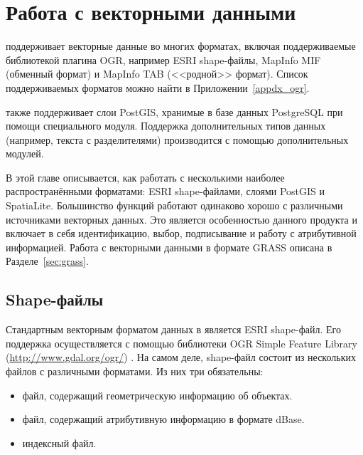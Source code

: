 
\chapter{Работа с векторными данными}\label{label_workingvector}


\qg поддерживает векторные данные во многих форматах, включая
поддерживаемые библиотекой плагина OGR, например ESRI shape-файлы,
MapInfo MIF (обменный формат)
и MapInfo TAB (<<родной>> формат).
Список поддерживаемых форматов можно найти в Приложении~\ref{appdx_ogr}.

\qg также поддерживает слои PostGIS,
хранимые в базе данных PostgreSQL при помощи специального модуля. Поддержка
дополнительных типов данных (например, текста с разделителями) производится
с помощью дополнительных модулей.

В этой главе описывается, как работать с несколькими наиболее
распространёнными форматами: ESRI shape-файлами, слоями PostGIS и SpatiaLite.
Большинство функций \qg работают одинаково хорошо с различными источниками
векторных данных. Это является особенностью данного продукта и включает в
себя идентификацию, выбор, подписывание и работу с атрибутивной информацией.
Работа с векторными данными в формате GRASS описана в Разделе~\ref{sec:grass}.

\section{Shape-файлы}

Стандартным векторным форматом данных в \qg является ESRI shape-файл. Его
поддержка осуществляется с помощью библиотеки OGR Simple Feature Library
(\url{http://www.gdal.org/ogr/}) . На самом деле, shape-файл
состоит из нескольких файлов с различными форматами. Из них три
обязательны: 

\begin{itemize}[label=--]
\item {} файл, содержащий геометрическую информацию об объектах.
\item {} файл, содержащий атрибутивную информацию в
формате dBase.
\item {} индексный файл.
\end{itemize}

